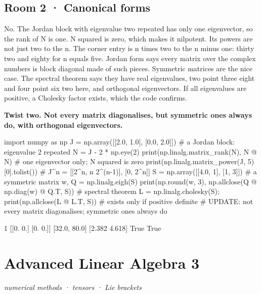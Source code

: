 \documentclass[11pt,a4paper]{report}
\begin{document}
\section*{Room 2 · Canonical forms}
No. The Jordan block with eigenvalue two repeated has only one eigenvector, so the rank of N is one. N squared is zero, which makes it nilpotent. Its powers are not just two to the n. The corner entry is n times two to the n minus one: thirty two and eighty for n equals five. Jordan form says every matrix over the complex numbers is block diagonal made of such pieces. Symmetric matrices are the nice case. The spectral theorem says they have real eigenvalues, two point three eight and four point six two here, and orthogonal eigenvectors. If all eigenvalues are positive, a Cholesky factor exists, which the code confirms.
\begin{tcolorbox}[colback=yellow!12,colframe=orange!70!black,boxrule=0.4pt,left=4pt,right=4pt,top=2pt,bottom=2pt]\textbf{Twist two. Not every matrix diagonalises, but symmetric ones always do, with orthogonal eigenvectors.}\end{tcolorbox}
\begin{Code}
import numpy as np
J = np.array([[2.0, 1.0], [0.0, 2.0]])     # a Jordan block: eigenvalue 2 repeated
N = J - 2 * np.eye(2)
print(np.linalg.matrix_rank(N), N @ N)     # one eigenvector only; N squared is zero
print(np.linalg.matrix_power(J, 5)[0].tolist())     # J^n = [[2^n, n 2^(n-1)], [0, 2^n]]
S = np.array([[4.0, 1], [1, 3]])           # a symmetric matrix
w, Q = np.linalg.eigh(S)
print(np.round(w, 3), np.allclose(Q @ np.diag(w) @ Q.T, S))    # spectral theorem
L = np.linalg.cholesky(S); print(np.allclose(L @ L.T, S))      # exists only if positive definite
# UPDATE: not every matrix diagonalises; symmetric ones always do
\end{Code}
\begin{Out}
1 [[0. 0.]
 [0. 0.]]
[32.0, 80.0]
[2.382 4.618] True
True
\end{Out}
\chapter{Advanced Linear Algebra 3}
\textit{numerical methods · tensors · Lie brackets}
\end{document}
